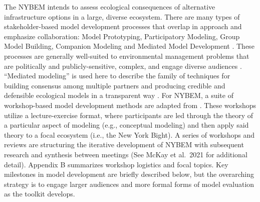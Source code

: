 \documentclass[
]{book}
\begin{document}
The NYBEM intends to assess ecological consequences of alternative infrastructure options in a large, diverse ecosystem. There are many types of stakeholder-based model development processes that overlap in approach and emphasize collaboration: Model Prototyping, Participatory Modeling, Group Model Building, Companion Modeling and Mediated Model Development \citetext{\citealp[See reviews by][]{voinov_modelling_2010}; \citealp{gray_environmental_2017}; \citealp[and][]{hall_mediated_2019}}. These processes are generally well-suited to environmental management problems that are politically and publicly-sensitive, complex, and engage diverse audiences \citep{van_den_belt_mediated_2006}. ``Mediated modeling'' is used here to describe the family of techniques for building consensus among multiple partners and producing credible and defensible ecological models in a transparent way \citep{van_den_belt_mediated_2006}.
For NYBEM, a suite of workshop-based model development methods are adapted from \citet{herman_unpacking_2019}. These workshops utilize a lecture-exercise format, where participants are led through the theory of a particular aspect of modeling (e.g., conceptual modeling) and then apply said theory to a focal ecosystem (i.e., the New York Bight). A series of workshops and reviews are structuring the iterative development of NYBEM with subsequent research and synthesis between meetings (See McKay et al.~2021 for additional detail). Appendix B summarizes workshop logistics and focal topics. Key milestones in model development are briefly described below, but the overarching strategy is to engage larger audiences and more formal forms of model evaluation as the toolkit develops.
\end{document}
